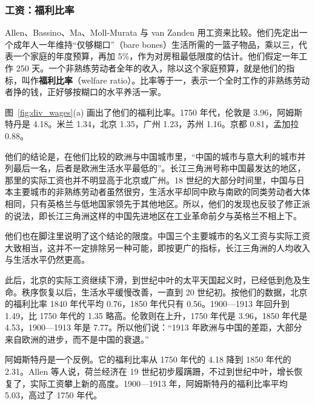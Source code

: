 \subsubsection{工资：福利比率}
Allen、Bassino、Ma、Moll-Murata 与 van Zanden 用工资来比较\cite{allen2009wp,allen2011china}。他们先定出一个成年人一年维持“仅够糊口”（bare bones）生活所需的一篮子物品，乘以三，代表一个家庭的年度预算，再加 5\%，作为对房租最低限度的估计\cite{allen2009wp}。他们假定一年工作 250 天。一个非熟练劳动者全年的收入，除以这个家庭预算，就是他们的指标，叫作\textbf{福利比率}（welfare ratio）。比率等于一，表示一个全时工作的非熟练劳动者挣的钱，正好够按糊口的水平养活一家\cite{allen2009wp}。

图~\ref{fig:div_wages}(a) 画出了他们的福利比率\cite{allen2011china}。1750 年代，伦敦是 3.96，阿姆斯特丹是 4.18。米兰 1.34，北京 1.35，广州 1.23，苏州 1.16。京都 0.81，孟加拉 0.88。

他们的结论是，在他们比较的欧洲与中国城市里，“中国的城市与意大利的城市并列最后一名，后者是欧洲生活水平最低的”。长江三角洲号称中国最发达的地区，那里的实际工资也并不明显高于北京或广州\cite{allen2009wp}。18 世纪的大部分时间里，中国与日本主要城市的非熟练劳动者虽然很穷，生活水平却同中欧与南欧的同类劳动者大体相同，只有英格兰与低地国家领先于其他地区\cite{allen2009wp}。所以，他们的发现也反驳了修正派的说法，即长江三角洲这样的中国先进地区在工业革命前夕与英格兰不相上下\cite{allen2009wp}。

他们也在脚注里说明了这个结论的限度。中国三个主要城市的名义工资与实际工资大致相当，这并不一定排除另一种可能，即按更广的指标，长江三角洲的人均收入与生活水平仍然更高\cite{allen2009wp}。

此后，北京的实际工资继续下滑，到世纪中叶的太平天国起义时，已经低到危及生命。秩序恢复以后，生活水平缓慢改善，一直到 20 世纪初\cite{allen2009wp}。按他们的数据，北京的福利比率 1840 年代平均 0.76，1850 年代只有 0.56。1900—1913 年回升到 1.49，比 1750 年代的 1.35 略高。伦敦则在上升，1750 年代是 3.96，1850 年代是 4.53，1900—1913 年是 7.77。所以他们说：“1913 年欧洲与中国的差距，大部分来自欧洲的进步，而不是中国的衰退。”\cite{allen2009wp}

阿姆斯特丹是一个反例。它的福利比率从 1750 年代的 4.18 降到 1850 年代的 2.31。Allen 等人说，荷兰经济在 19 世纪初步履蹒跚，不过到世纪中叶，增长恢复了，实际工资攀上新的高度\cite{allen2009wp,allen2011china}。1900—1913 年，阿姆斯特丹的福利比率平均 5.03，高过了 1750 年代。

